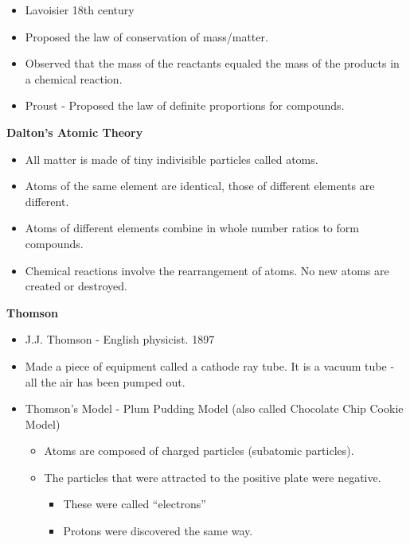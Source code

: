 \documentclass[../hchem.tex]{subfiles}
\begin{document}
\begin{itemize}
    \item Lavoisier 18th century 
    \item Proposed the law of conservation of mass/matter.
    \item Observed that the mass of the reactants equaled the mass of the products in a chemical reaction.
\end{itemize}

\begin{itemize}
    \item Proust - Proposed the law of definite proportions for compounds.
\end{itemize}

\textbf{Dalton's Atomic Theory}
\begin{itemize}
    \item All matter is made of tiny indivisible particles called atoms.
    \item Atoms of the same element are identical, those of different elements are different.
    \item Atoms of different elements combine in whole number ratios to form compounds.
    \item Chemical reactions involve the rearrangement of atoms. No new atoms are created or destroyed.
\end{itemize}

\textbf{Thomson}
\begin{itemize}
    \item J.J. Thomson - English physicist. 1897
    \item Made a piece of equipment called a cathode ray tube. It is a vacuum tube - all the air has been pumped out.
    \item Thomson's Model - Plum Pudding Model (also called Chocolate Chip Cookie Model)
    \begin{itemize}
        \item Atoms are composed of charged particles (subatomic particles).
        \item The particles that were attracted to the positive plate were negative.
        \begin{itemize}
            \item These were called ``electrons''
            \item Protons were discovered the same way.
        \end{itemize}
    \end{itemize}
\end{itemize}
\end{document}
